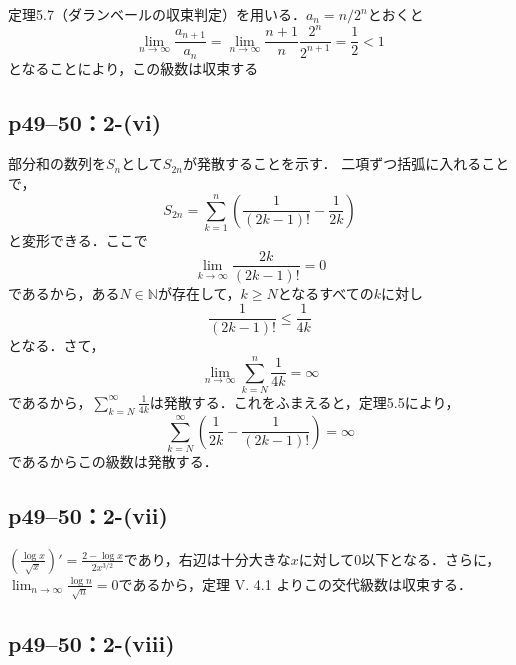 \begin{screen}
    定理5.7（ダランベールの収束判定）を用いる．$a_n=n/2^n$とおくと
    \[
        \lim_{n \to \infty}\frac{a_{n+1}}{a_n}=\lim_{n \to \infty}\frac{n+1}{n}\frac{2^n}{2^{n+1}}=\frac{1}{2}<1
    \]
    となることにより，この級数は収束する
\end{screen}

\subsection*{p49--50：2-(vi)}

\begin{screen}
    部分和の数列を$S_{n}$として$S_{2n}$が発散することを示す． 二項ずつ括弧に入れることで，
    \[
        S_{2n} = \sum ^{n}_{k=1} \left (\frac{1}{(2k-1)!} - \frac{1}{2k} \right )
    \]
    と変形できる．ここで
    \[
        \lim_{k \to \infty} \frac{2k}{(2k-1)!} = 0
    \]
    であるから，ある$N \in \mathbb{N}$が存在して，$k \geq N$となるすべての$k$に対し
    \[
        \frac{1}{(2k-1)!} \leq \frac{1}{4k}
    \]
    となる．さて，
    \[
        \lim_{n \to \infty} \sum ^{n}_{k=N} \frac{1}{4k} = \infty
    \]
    であるから，$\sum ^{\infty}_{k=N} \frac{1}{4k}$は発散する．これをふまえると，定理5.5により，
    \[
        \sum^{\infty}_{k=N} \left (\frac{1}{2k} - \frac{1}{(2k-1)!}\right) =\infty
    \]
    であるからこの級数は発散する．
\end{screen}



\subsection*{p49--50：2-(vii)}
\begin{screen}
    $\left (\frac{\log x}{\sqrt x}\right)' = \frac{2-\log x}{2x^{3/2}}$であり，右辺は十分大きな$x$に対して$0$以下となる．さらに，$\lim _{n \to \infty} \frac{\log n}{\sqrt n} = 0$であるから，定理 V. 4.1 よりこの交代級数は収束する．
\end{screen}

\subsection*{p49--50：2-(viii)}

